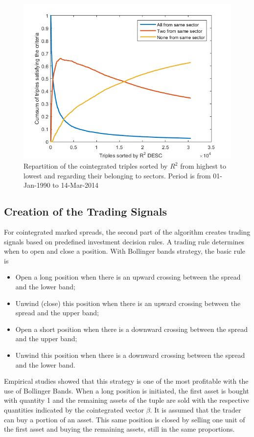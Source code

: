 \documentclass[11pt,a4,twosided,singlespacing,titlepagenumber=on]{scrreprt}
\numberwithin{equation}{chapter} %
\theoremstyle{remark}
\begin{document}
 
\begin{figure}[H]
\centering
\includegraphics[width = 1\textwidth]{triples_sector}
\caption{Repartition of the cointegrated triples sorted by $R^2$ from highest to lowest and regarding their belonging to sectors. Period is from 01-Jan-1990 to 14-Mar-2014}
\label{triples_sector}
\end{figure}

\subsection{Creation of the Trading Signals}
For cointegrated marked spreads, the second part of the algorithm creates trading signals based on predefined investment decision rules. A trading rule determines when to open and close a position. With Bollinger bands strategy, the basic rule is

\begin{itemize}
\item Open a long position when there is an upward crossing between the spread and the lower band;
\item Unwind (close) this position when there is an upward crossing between the spread and the upper band;
\item Open a short position when there is a downward crossing between the spread and the upper band;
\item Unwind this position when there is a downward crossing between the spread and the lower band.
\end{itemize}
Empirical studies showed that this strategy is one of the most profitable with the use of Bollinger Bands. When a long position is initiated, the first asset is bought with quantity 1 and the remaining assets of the tuple are sold with the respective quantities indicated by the cointegrated vector $\beta$. It is assumed that the trader can buy a portion of an asset. This same position is closed by selling one unit of the first asset and buying the remaining assets, still in the same proportions.
\end{document}

